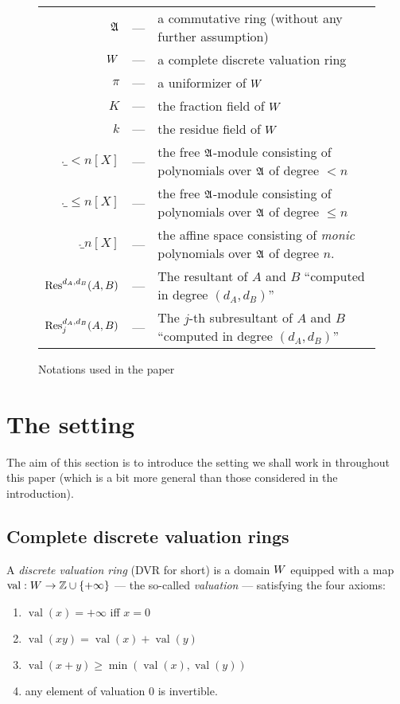 \documentclass{article}
\DeclareMathOperator{\val}{val}
\begin{document}
\begin{figure}
\begin{center}
\begin{tabular}{rcl}
$\mathfrak A$ &--- & a commutative ring (without any further assumption) \\
$W$ &---& a complete discrete valuation ring \\
$\pi$ &---& a uniformizer of $W$ \\
$K$ &---& the fraction field of $W$ \\
$k$ &---& the residue field of $W$ \smallskip \\

$\ring_{<n}[X]$ &---& the free $\mathfrak A$-module consisting of
polynomials over $\mathfrak A$ of degree $<n$ \\
$\ring_{\leq n}[X]$ &---& the free $\mathfrak A$-module consisting of
polynomials over $\mathfrak A$ of degree $\leq n$ \\
$\ring_n[X]$ &---& the affine space consisting of \emph{monic}
polynomials over $\mathfrak A$ of degree $n$. \smallskip \\

$\text{\rm Res}^{d_A,d_B}(A,B)$ &---& The resultant of $A$ and
$B$ ``computed in degree $(d_A,d_B)$'' \\
$\text{\rm Res}_j^{d_A,d_B}(A,B)$ &---& The $j$-th subresultant of $A$ and
$B$ ``computed in degree $(d_A,d_B)$'' \\
\end{tabular}
\end{center}

\vspace{-0.2cm}

\caption{Notations used in the paper}
\label{fig:notations}
\end{figure}

\section{The setting}
\label{subsec:setting}

The aim of this section is to introduce the setting we shall work in 
throughout this paper (which is a bit more general than those considered 
in the introduction).

\subsection{Complete discrete valuation rings}

\begin{deftn}
A \emph{discrete valuation ring} (DVR for short) is a domain $W$
equipped with a map $\val : \A \to \Z \cup \{+\infty\}$ --- the 
so-called \emph{valuation} --- satisfying the four axioms: 
\begin{enumerate}
\item $\val(x) = +\infty$ iff $x = 0$
\item $\val(xy) = \val(x) + \val(y)$
\item $\val(x+y) \geq \min(\val(x), \val(y))$
\item any element of valuation $0$ is invertible.
\end{enumerate}
\end{deftn}
\end{document}
